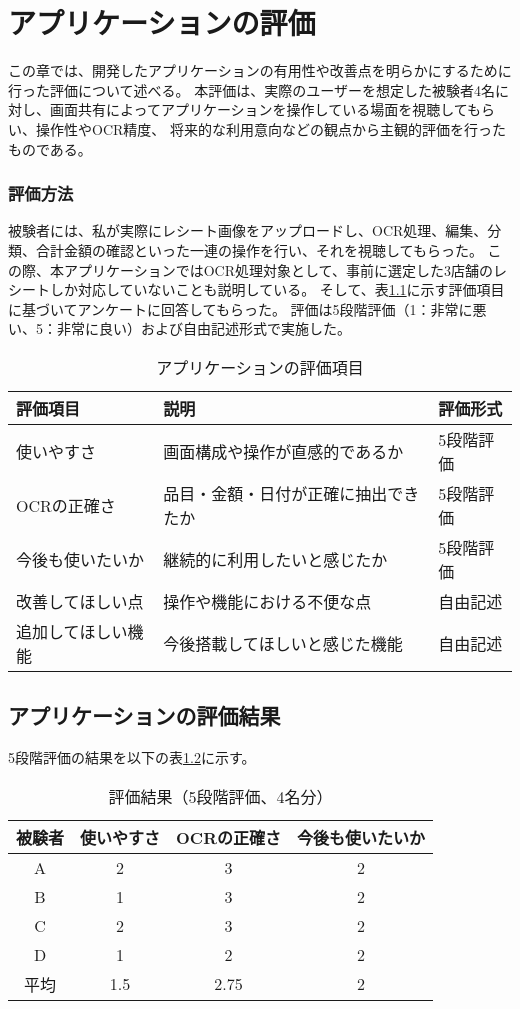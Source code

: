 \documentclass[main]{subfiles}
\begin{document}
\chapter{アプリケーションの評価}
\label{cha:evaluation}
この章では、開発したアプリケーションの有用性や改善点を明らかにするために行った評価について述べる。
本評価は、実際のユーザーを想定した被験者4名に対し、画面共有によってアプリケーションを操作している場面を視聴してもらい、操作性やOCR精度、
将来的な利用意向などの観点から主観的評価を行ったものである。

\subsection{評価方法}
被験者には、私が実際にレシート画像をアップロードし、OCR処理、編集、分類、合計金額の確認といった一連の操作を行い、それを視聴してもらった。
この際、本アプリケーションではOCR処理対象として、事前に選定した3店舗のレシートしか対応していないことも説明している。
そして、表\ref{tab:evaluation_criteria}に示す評価項目に基づいてアンケートに回答してもらった。
評価は5段階評価（1：非常に悪い、5：非常に良い）および自由記述形式で実施した。

\begin{table}[htbp]
\centering
\caption{アプリケーションの評価項目}
\label{tab:evaluation_criteria}
\begin{tabular}{lll}
\hline
評価項目 & 説明 & 評価形式 \\
\hline
使いやすさ & 画面構成や操作が直感的であるか & 5段階評価 \\
OCRの正確さ & 品目・金額・日付が正確に抽出できたか & 5段階評価 \\
今後も使いたいか & 継続的に利用したいと感じたか & 5段階評価 \\
改善してほしい点 & 操作や機能における不便な点 & 自由記述 \\
追加してほしい機能 & 今後搭載してほしいと感じた機能 & 自由記述 \\
\hline
\end{tabular}
\end{table}

\section{アプリケーションの評価結果}
5段階評価の結果を以下の表\ref{tab:evaluation_results}に示す。

\begin{table}[htbp]
\centering
\caption{評価結果（5段階評価、4名分）}
\label{tab:evaluation_results}
\begin{tabular}{cccc}
\hline
被験者 & 使いやすさ & OCRの正確さ & 今後も使いたいか \\
\hline
A & 2 & 3 & 2 \\
B & 1 & 3 & 2 \\
C & 2 & 3 & 2 \\
D & 1 & 2 & 2 \\
\hline
平均 & 1.5 & 2.75 & 2 \\
\hline
\end{tabular}
\end{table}
\end{document}
